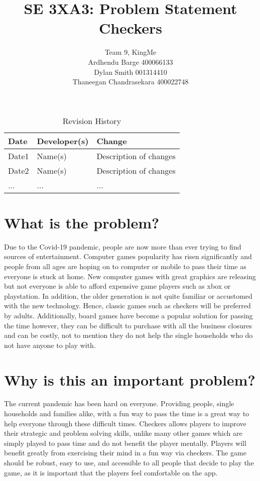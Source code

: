 \documentclass{article}
\title{SE 3XA3: Problem Statement\\Checkers}
\author{Team 9, KingMe
		\\ Ardhendu Barge 400066133
		\\ Dylan Smith 001314410
		\\ Thaneegan Chandrasekara 400022748
}
\date{}
\begin{document}
\begin{table}[hp]
\caption{Revision History} \label{TblRevisionHistory}
\begin{tabularx}{\textwidth}{llX}
\toprule
\textbf{Date} & \textbf{Developer(s)} & \textbf{Change}\\
\midrule
Date1 & Name(s) & Description of changes\\
Date2 & Name(s) & Description of changes\\
... & ... & ...\\
\bottomrule
\end{tabularx}
\end{table}

\newpage

\maketitle

\section{What is the problem?}
Due to the Covid-19 pandemic, people are now more than ever trying to find sources of entertainment. Computer games popularity has risen significantly and people from all ages are hoping on to computer or mobile to pass their time as everyone is stuck at home. New computer games with great graphics are releasing but not everyone is able to afford expensive game players such as xbox or playstation. In addition, the older generation is not quite familiar or accustomed  with the new technology. Hence, classic games such as checkers will be preferred by adults. Additionally, board games have become a popular solution for passing the time however, they can be difficult to purchase with all the business closures and can be costly, not to mention they do not help the single households who do not have anyone to play with.

\section{Why is this an important problem?}
The current pandemic has been hard on everyone. Providing people, single households and families alike, with a fun way to pass the time is a great way to help everyone through these difficult times. Checkers allows players to improve their strategic and problem solving skills, unlike many other games which are simply played to pass time and do not benefit the player mentally. Players will benefit greatly from exercising their mind in a fun way via checkers. The game should be robust, easy to use, and accessible to all people that decide to play the game, as it is important that the players feel comfortable on the app.
\end{document}
